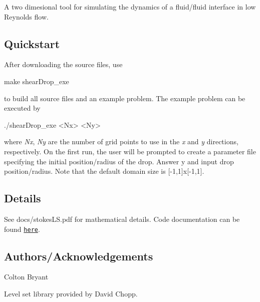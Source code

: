 A two dimesional tool for simulating the dynamics of a fluid/fluid interface in low Reynolds flow.

\subsection*{Quickstart}

After downloading the source files, use 
\begin{DoxyCode}
make shearDrop\_exe
\end{DoxyCode}
 to build all source files and an example problem. The example problem can be executed by 
\begin{DoxyCode}
./shearDrop\_exe <Nx> <Ny>
\end{DoxyCode}
 where {\itshape Nx}, {\itshape Ny} are the number of grid points to use in the {\itshape x} and {\itshape y} directions, respectively. On the first run, the user will be prompted to create a parameter file specifying the initial position/radius of the drop. Answer {\ttfamily y} and input drop position/radius. Note that the default domain size is {\ttfamily \mbox{[}-\/1,1\mbox{]}x\mbox{[}-\/1,1\mbox{]}}.

\subsection*{Details}

See docs/stokes\+L\+S.\+pdf for mathematical details. Code documentation can be found \href{https://cjbryant135.github.io/stokesLS/html/md_README.html}{\tt here}.

\subsection*{Authors/\+Acknowledgements}

Colton Bryant

Level set library provided by David Chopp. 